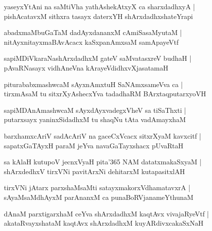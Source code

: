 \documentclass[twoside,12pt,openright]{book}
\newcounter{shloka}[chapter]
\begin{document}
\begin{shloka}%
yaseyxYtAni na saMtiVha yathAshekAtxyX ca sharxdadhxyA |\\
pishAcatavxM sithxra tasayx daterxYH shArxdadhxshateYrapi
\end{shloka}

\begin{shloka}%
abadxmaMbuGaTaM dadAyxdananxM cAmiSasaMyutaM |\\
nitAyxnitayxmaBAvAcacx kaSxpanAmxsaM samApayeVtf
\end{shloka}

\begin{shloka}%
sapiMDiVkaraNashArxdadhxM gateV saMvatasxreV budhaH |\\
pAvaRNasayx vidhAneVna kArayeVdidhxvXjasatamaH 
\end{shloka}

\begin{shloka}%
piturababxmashwcaM sAyxnAmxtuH SaNAmxsameVva ca |\\
tirxmAsaM tu sitxrXyAshecxYva tadadhaRM BArxtaqputarxyoVH 
\end{shloka}

\begin{shloka}%
sapiMDAnAmashwcaM sAyxdAyxvadegxVheV sa tiSaThxti |\\
putarxsayx yaninxSidadhxM tu shaqNu tAta vadAmayxhaM 
\end{shloka}

\begin{shloka}%
barxhamxcAriV sadAcAriV na gaceCxVcacx sitxrXyaM kavxcitf |\\
sapatxGaTAyxH paraM jeYva navaGaTayxshacx pUvaRtaH 
\end{shloka}

\begin{shloka}%
sa kAlaH kutupoV jecnxVyaH pita\char'365 NAM datatxmakaSxyaM |\\
shArxdedhxV tirxVNi pavitArxNi dehitarxM kutapasitxlAH 
\end{shloka}

\begin{shloka}%
tirxVNi jAtarx parxshaMsaMti satayxmakorxVdhamatavxrA |\\
sAyaMsaMdhAyxM parAnanxM ca punaBoRVjanameYthunaM 
\end{shloka}

\begin{shloka}%
dAnaM parxtigarxhaM ceYva shArxdadhxM kaqtAvx vivajaRyeVtf |\\
akataRvayxshataM kaqtAvx shArxdadhxM kuyARdivxcakaSxNaH 
\end{shloka}
\end{document}
